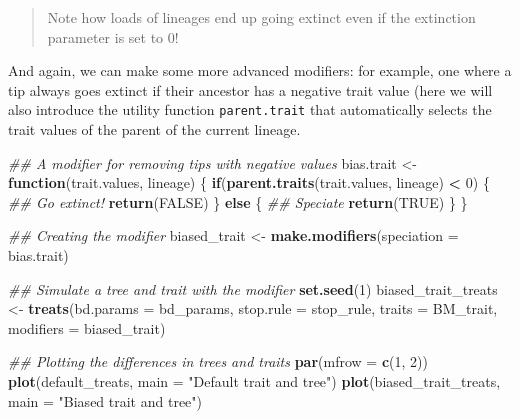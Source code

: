 \documentclass[
]{book}
\newenvironment{Shaded}{\begin{snugshade}}{\end{snugshade}}
\newcommand{\CommentTok}[1]{\textcolor[rgb]{0.56,0.35,0.01}{\textit{#1}}}
\newcommand{\ControlFlowTok}[1]{\textcolor[rgb]{0.13,0.29,0.53}{\textbf{#1}}}
\newcommand{\DataTypeTok}[1]{\textcolor[rgb]{0.13,0.29,0.53}{#1}}
\newcommand{\DecValTok}[1]{\textcolor[rgb]{0.00,0.00,0.81}{#1}}
\newcommand{\KeywordTok}[1]{\textcolor[rgb]{0.13,0.29,0.53}{\textbf{#1}}}
\newcommand{\NormalTok}[1]{#1}
\newcommand{\OperatorTok}[1]{\textcolor[rgb]{0.81,0.36,0.00}{\textbf{#1}}}
\newcommand{\OtherTok}[1]{\textcolor[rgb]{0.56,0.35,0.01}{#1}}
\newcommand{\StringTok}[1]{\textcolor[rgb]{0.31,0.60,0.02}{#1}}
\begin{document}
\begin{quote}
Note how loads of lineages end up going extinct even if the extinction parameter is set to 0!
\end{quote}

And again, we can make some more advanced modifiers: for example, one where a tip always goes extinct if their ancestor has a negative trait value (here we will also introduce the utility function \texttt{parent.trait} that automatically selects the trait values of the parent of the current lineage.

\begin{Shaded}
\begin{Highlighting}[]
\CommentTok{\#\# A modifier for removing tips with negative values}
\NormalTok{bias.trait \textless{}{-}}\StringTok{ }\ControlFlowTok{function}\NormalTok{(trait.values, lineage) \{}
    \ControlFlowTok{if}\NormalTok{(}\KeywordTok{parent.traits}\NormalTok{(trait.values, lineage) }\OperatorTok{\textless{}}\StringTok{ }\DecValTok{0}\NormalTok{) \{}
        \CommentTok{\#\# Go extinct!}
        \KeywordTok{return}\NormalTok{(}\OtherTok{FALSE}\NormalTok{)}
\NormalTok{    \} }\ControlFlowTok{else}\NormalTok{ \{}
        \CommentTok{\#\# Speciate}
        \KeywordTok{return}\NormalTok{(}\OtherTok{TRUE}\NormalTok{)}
\NormalTok{    \}}
\NormalTok{\}}

\CommentTok{\#\# Creating the modifier}
\NormalTok{biased\_trait \textless{}{-}}\StringTok{ }\KeywordTok{make.modifiers}\NormalTok{(}\DataTypeTok{speciation =}\NormalTok{ bias.trait)}

\CommentTok{\#\# Simulate a tree and trait with the modifier}
\KeywordTok{set.seed}\NormalTok{(}\DecValTok{1}\NormalTok{)}
\NormalTok{biased\_trait\_treats \textless{}{-}}\StringTok{ }\KeywordTok{treats}\NormalTok{(}\DataTypeTok{bd.params =}\NormalTok{ bd\_params,}
                          \DataTypeTok{stop.rule =}\NormalTok{ stop\_rule,}
                          \DataTypeTok{traits    =}\NormalTok{ BM\_trait,}
                          \DataTypeTok{modifiers =}\NormalTok{ biased\_trait)}

\CommentTok{\#\# Plotting the differences in trees and traits}
\KeywordTok{par}\NormalTok{(}\DataTypeTok{mfrow =} \KeywordTok{c}\NormalTok{(}\DecValTok{1}\NormalTok{, }\DecValTok{2}\NormalTok{))}
\KeywordTok{plot}\NormalTok{(default\_treats, }\DataTypeTok{main =} \StringTok{"Default trait and tree"}\NormalTok{)}
\KeywordTok{plot}\NormalTok{(biased\_trait\_treats, }\DataTypeTok{main =} \StringTok{"Biased trait and tree"}\NormalTok{)}
\end{Highlighting}
\end{Shaded}
\end{document}
